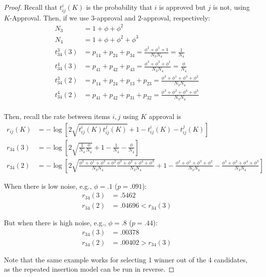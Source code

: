 \documentclass[10pt]{article}
\begin{document}
\begin{ReviewVerbatim}
\begin{proof}
Recall that $t_{ij}^i(K)$ is the probability that $i$ is approved but $j$ is not, using $K$-Approval. Then, if we use $3$-approval and $2$-approval, respectively:
\begin{align*}
N_3 &= 1 + \phi + \phi^2\\
N_4 &= 1 + \phi + \phi^2+ \phi^3\\
t_{34}^3(3) &= p_{14} + p_{24} + p_{34}= \frac{\phi^2  + \phi^1 + 1}{N_3N_4}= \frac{1}{N_4}\\
t_{34}^4(3) &= p_{41} + p_{42} + p_{43} = \frac{\phi^3  + \phi^2 + \phi^1}{N_3N_4} = \frac{\phi}{N_4}\\
t_{34}^3(2) &= p_{14} + p_{24} + p_{13} + p_{23} = \frac{\phi^2  + \phi^1 + \phi^3 + \phi^2}{N_3N_4}\\
t_{34}^4(2) &= p_{41} + p_{42} + p_{31} + p_{32} = \frac{\phi^3  + \phi^2 + \phi^4 + \phi^3}{N_3N_4}\\
\end{align*}

Then, recall the rate between items $i,j$ using $K$ approval is
\begin{align*}
	r_{ij}(K) &= -\log\left[ 2\sqrt{t_{ij}^i(K)t_{ij}^j(K)} + 1 - t_{ij}^i(K) - t_{ij}^j(K) \right]\\
	 r_{34}(3) &= 	-\log\left[ 2\sqrt{\frac{1}{N_4}\frac{\phi}{N_4}} + 1 - \frac{1}{N_4} - \frac{\phi}{N_4} \right]\\
%
	 r_{34}(2) &= 	-\log\left[ 2\sqrt{\frac{\phi^2  + \phi^1 + \phi^3 + \phi^2}{N_3N_4}\frac{\phi^3  + \phi^2 + \phi^4 + \phi^3}{N_3N_4}} + 1 - \frac{\phi^2  + \phi^1 + \phi^3 + \phi^2}{N_3N_4} - \frac{\phi^3  + \phi^2 + \phi^4 + \phi^3}{N_3N_4} \right]
\end{align*}

When there is low noise, e.g., $\phi = .1$ ($p = .091$):
\begin{align*}
r_{34}(3) &= .5462\\
r_{34}(2) &= .04696 < r_{34}(3)
\end{align*}

But when there is high noise, e.g., $\phi = .8$ ($p=.44$):
\begin{align*}
r_{34}(3) &= .00378\\
r_{34}(2) &= .00402 > r_{34}(3)
\end{align*}


Note that the same example works for selecting 1 winner out of the 4 candidates, as the repeated insertion model can be run in reverse.

\end{proof}
\end{ReviewVerbatim}
\end{document}
